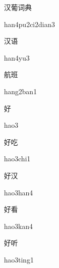 \begin{multicols*}{2}
\begin{verbete}{汉葡词典}
\begin{pronuncia}{han4pu2ci2dian3}
\end{pronuncia}
\end{verbete}

\begin{verbete}[han4yu3]{汉语}
\begin{pronuncia}{han4yu3}
\end{pronuncia}
\end{verbete}

\begin{verbete}{航班}
\begin{pronuncia}{hang2ban1}
\end{pronuncia}
\end{verbete}

\begin{verbete}[hao3]{好}
\begin{pronuncia}{hao3}
\end{pronuncia}
\end{verbete}

\begin{verbete}{好吃}
\begin{pronuncia}{hao3chi1}
\end{pronuncia}
\end{verbete}

\begin{verbete}{好汉}
\begin{pronuncia}{hao3han4}
\end{pronuncia}
\end{verbete}

\begin{verbete}{好看}
\begin{pronuncia}{hao3kan4}
\end{pronuncia}
\end{verbete}

\begin{verbete}{好听}
\begin{pronuncia}{hao3ting1}
\end{pronuncia}
\end{verbete}


\end{multicols*}
